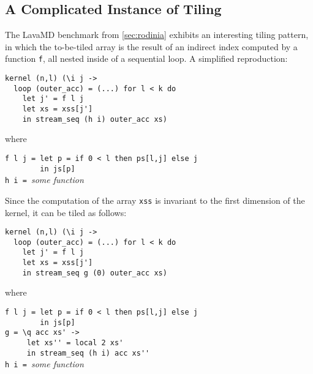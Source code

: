 \subsection{A Complicated Instance of Tiling}
\label{sec:lavamd-tiling}

The LavaMD benchmark from \cref{sec:rodinia} exhibits an interesting
tiling pattern, in which the to-be-tiled array is the result of an
indirect index computed by a function \texttt{f}, all nested inside of
a sequential loop.  A simplified reproduction:

\begin{lstlisting}
kernel (n,l) (\i j ->
  loop (outer_acc) = (...) for l < k do
    let j' = f l j
    let xs = xss[j']
    in stream_seq (h i) outer_acc xs)
\end{lstlisting}
\begin{minipage}[t]{0.1\linewidth}
  \begin{flushright}
    where
  \end{flushright}
\end{minipage}
\begin{minipage}[t]{0.8\linewidth}
\lstinline{f l j = let p = if 0 < l then ps[l,j] else j}\\
\lstinline{        in js[p]}\\
\lstinline{h i = }\textit{some function}
\end{minipage}
\vspace{1em}

Since the computation of the array \texttt{xss} is invariant to the
first dimension of the kernel, it can be tiled as follows:

\begin{lstlisting}
kernel (n,l) (\i j ->
  loop (outer_acc) = (...) for l < k do
    let j' = f l j
    let xs = xss[j']
    in stream_seq g (0) outer_acc xs)
\end{lstlisting}
\begin{minipage}[t]{0.1\linewidth}
  \begin{flushright}
    where
  \end{flushright}
\end{minipage}
\begin{minipage}[t]{0.8\linewidth}
\lstinline{f l j = let p = if 0 < l then ps[l,j] else j}\\
\lstinline{        in js[p]}\\
\lstinline{g = \q acc xs' ->}\\
\lstinline{     let xs'' = local 2 xs'}\\
\lstinline{     in stream_seq (h i) acc xs''}\\
\lstinline{h i = }\textit{some function}
\end{minipage}
\vspace{1em}

